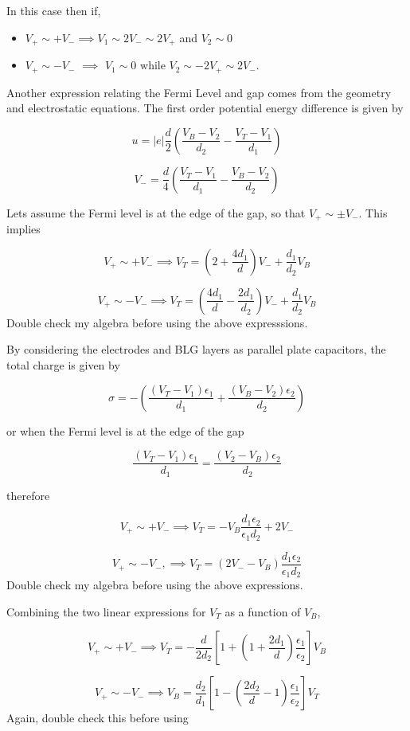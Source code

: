 \documentclass[11pt]{article}
\begin{document}
In this case then if,

\begin{itemize}
\item{$V_+ \sim + V_- \implies V_1\sim 2 V_- \sim 2 V_+$ and $V_2\sim 0$}

\item{$V_+\sim - V_-$ $\implies$ $V_1\sim 0$ while $V_2\sim -2V_+\sim 2V_-$.}

\end{itemize}

Another expression relating the Fermi Level and gap comes from the geometry and electrostatic equations. The first order potential energy difference is given by

$$ u = |e|\frac{d}{2} \left( \frac{V_B-V_2}{d_2} - \frac{V_T-V_1}{d_1} \right)  $$

\begin{equation}\label{vdiff}
V_- = \frac{d}{4} \left(\frac{V_T-V_1}{d_1} - \frac{V_B-V_2}{d_2} \right) 
\end{equation}

Lets assume the Fermi level is at the edge of the gap, so that $V_+\sim \pm V_-$. This implies

$$V_+\sim +V_- \implies V_T = (2+\frac{4d_1}{d})V_- + \frac{d_1}{d_2}V_B$$

$$V_+\sim -V_- \implies  V_T = (\frac{4d_1}{d} - \frac{2d_1}{d_2})V_- + \frac{d_1}{d_2}V_B$$
Double check my algebra before using the above expresssions.

By considering the electrodes and BLG layers as parallel plate capacitors, the total charge is given by

$$\sigma = -\left(\frac{(V_T-V_1)\epsilon_1}{d_1} + \frac{(V_B-V_2)\epsilon_2}{d_2} \right) $$

or when the Fermi level is at the edge of the gap

\begin{equation}\label{charge}
\frac{(V_T-V_1)\epsilon_1}{d_1} = \frac{(V_2-V_B)\epsilon_2}{d_2}
\end{equation}

therefore

$$V_+\sim + V_- \implies V_T = -V_B\frac{d_1\epsilon_2}{\epsilon_1 d_2}+2V_-$$

$$V_+\sim - V_-, \implies V_T = (2V_- - V_B)\frac{d_1\epsilon_2}{\epsilon_1 d_2}$$
Double check my algebra before using the above expressions.

Combining the two linear expressions for $V_T$ as a function of $V_B$,

$$V_+\sim +V_- \implies V_T = -\frac{d}{2d_2}\left[ 1 + (1+\frac{2d_1}{d})\frac{\epsilon_1}{\epsilon_2}  \right] V_B$$

$$V_+\sim -V_- \implies V_B= \frac{d_2}{d_1}\left[ 1 - (\frac{2d_2}{d} - 1)\frac{\epsilon_1}{\epsilon_2}\right] V_T $$
Again, double check this before using
\end{document}
